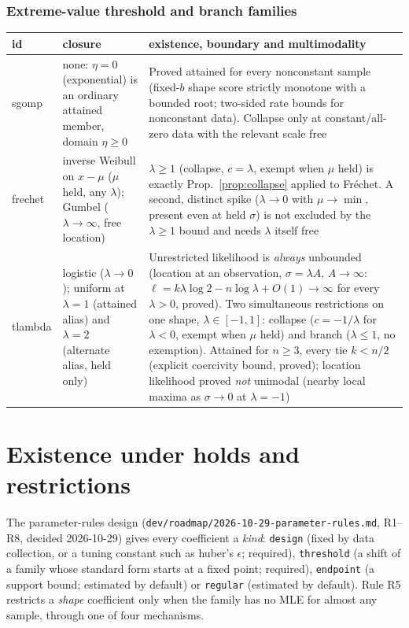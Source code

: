 \documentclass[11pt]{article}
\newcommand{\code}[1]{\texttt{#1}}
\theoremstyle{plain}
\theoremstyle{definition}
\theoremstyle{remark}
\begin{document}
\subsubsection*{Extreme-value threshold and branch families}

\begin{center}
\small
\begin{tabular}{@{}l p{4.2cm} p{8.2cm}@{}}
\toprule
id & closure & existence, boundary and multimodality \\
\midrule
sgomp & none: $\eta=0$ (exponential) is an ordinary attained member,
  domain $\eta\ge0$ &
  Proved attained for every nonconstant sample (fixed-$b$ shape score
  strictly monotone with a bounded root; two-sided rate bounds for
  nonconstant data). Collapse only at constant/all-zero data with the
  relevant scale free \\
frechet & inverse Weibull on $x-\mu$ ($\mu$ held, any $\lambda$); Gumbel
  ($\lambda\to\infty$, free location) &
  $\lambda\ge1$ (collapse, $c=\lambda$, exempt when $\mu$ held) is exactly
  Prop.~\ref{prop:collapse} applied to Fr\'echet. A second, distinct spike
  ($\lambda\to0$ with $\mu\to\min$, present even at held $\sigma$) is not
  excluded by the $\lambda\ge1$ bound and needs $\lambda$ itself free \\
tlambda & logistic ($\lambda\to0$); uniform at $\lambda=1$ (attained
  alias) and $\lambda=2$ (alternate alias, held only) &
  Unrestricted likelihood is \emph{always} unbounded (location at an
  observation, $\sigma=\lambda A$, $A\to\infty$: $\ell=k\lambda\log2-n\log
  \lambda+O(1)\to\infty$ for every $\lambda>0$, proved). Two simultaneous
  restrictions on one shape, $\lambda\in[-1,1]$: collapse ($c=-1/\lambda$
  for $\lambda<0$, exempt when $\mu$ held) and branch ($\lambda\le1$, no
  exemption). Attained for $n\ge3$, every tie $k<n/2$ (explicit coercivity
  bound, proved); location likelihood proved \emph{not} unimodal (nearby
  local maxima as $\sigma\to0$ at $\lambda=-1$) \\
\bottomrule
\end{tabular}
\end{center}

\section{Existence under holds and restrictions}\label{sec:holds-restrictions}

The parameter-rules design (\code{dev/roadmap/2026-10-29-parameter-rules.md},
R1--R8, decided 2026-10-29) gives every coefficient a \emph{kind}:
\code{design} (fixed by data collection, or a tuning constant such as
huber's $\epsilon$; required), \code{threshold} (a shift of a family whose
standard form starts at a fixed point; required), \code{endpoint} (a support
bound; estimated by default) or \code{regular} (estimated by default). Rule
R5 restricts a \emph{shape} coefficient only when the family has no MLE for
almost any sample, through one of four mechanisms.
\end{document}
